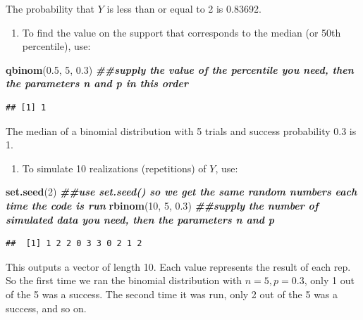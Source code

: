 \documentclass[
]{book}
\newenvironment{Shaded}{\begin{snugshade}}{\end{snugshade}}
\newcommand{\DecValTok}[1]{\textcolor[rgb]{0.00,0.00,0.81}{#1}}
\newcommand{\DocumentationTok}[1]{\textcolor[rgb]{0.56,0.35,0.01}{\textbf{\textit{#1}}}}
\newcommand{\FloatTok}[1]{\textcolor[rgb]{0.00,0.00,0.81}{#1}}
\newcommand{\FunctionTok}[1]{\textcolor[rgb]{0.13,0.29,0.53}{\textbf{#1}}}
\newcommand{\NormalTok}[1]{#1}
\providecommand{\tightlist}{%
  \setlength{\itemsep}{0pt}\setlength{\parskip}{0pt}}
\begin{document}
The probability that \(Y\) is less than or equal to 2 is 0.83692.

\begin{enumerate}
\def\labelenumi{\arabic{enumi}.}
\setcounter{enumi}{2}
\tightlist
\item
  To find the value on the support that corresponds to the median (or 50th percentile), use:
\end{enumerate}

\begin{Shaded}
\begin{Highlighting}[]
\FunctionTok{qbinom}\NormalTok{(}\FloatTok{0.5}\NormalTok{, }\DecValTok{5}\NormalTok{, }\FloatTok{0.3}\NormalTok{) }\DocumentationTok{\#\#supply the value of the percentile you need, then the parameters n and p in this order}
\end{Highlighting}
\end{Shaded}

\begin{verbatim}
## [1] 1
\end{verbatim}

The median of a binomial distribution with 5 trials and success probability 0.3 is 1.

\begin{enumerate}
\def\labelenumi{\arabic{enumi}.}
\setcounter{enumi}{3}
\tightlist
\item
  To simulate 10 realizations (repetitions) of \(Y\), use:
\end{enumerate}

\begin{Shaded}
\begin{Highlighting}[]
\FunctionTok{set.seed}\NormalTok{(}\DecValTok{2}\NormalTok{) }\DocumentationTok{\#\#use set.seed() so we get the same random numbers each time the code is run}
\FunctionTok{rbinom}\NormalTok{(}\DecValTok{10}\NormalTok{, }\DecValTok{5}\NormalTok{, }\FloatTok{0.3}\NormalTok{) }\DocumentationTok{\#\#supply the number of simulated data you need, then the parameters n and p}
\end{Highlighting}
\end{Shaded}

\begin{verbatim}
##  [1] 1 2 2 0 3 3 0 2 1 2
\end{verbatim}

This outputs a vector of length 10. Each value represents the result of each rep. So the first time we ran the binomial distribution with \(n=5, p=0.3\), only 1 out of the 5 was a success. The second time it was run, only 2 out of the 5 was a success, and so on.
\end{document}
